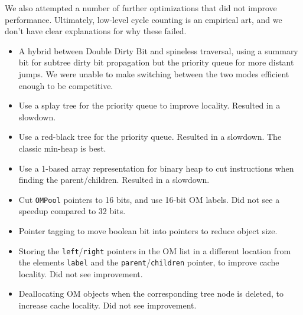 We also attempted a number of further optimizations
  that did not improve performance.
Ultimately, low-level cycle counting is an empirical art,
  and we don't have clear explanations for why these failed.
\begin{itemize}
\item A hybrid between Double Dirty Bit and spineless traversal,
  using a summary bit for subtree dirty bit propagation
  but the priority queue for more distant jumps.
  We were unable to make switching between the two modes efficient enough
  to be competitive.
\item Use a splay tree for the priority queue to improve locality.
  Resulted in a slowdown.
\item Use a red-black tree for the priority queue.
  Resulted in a slowdown. The classic min-heap is best.
\item Use a 1-based array representation for binary heap
  to cut instructions when finding the parent/children.
  Resulted in a slowdown.
\item Cut \texttt{OMPool} pointers to 16 bits, and use 16-bit OM labels.
  Did not see a speedup compared to 32 bits.
\item Pointer tagging to move boolean bit into pointers to reduce object size.
\item Storing the \texttt{left}/\texttt{right} pointers in the OM list in a different location from the elements \texttt{label} and the \texttt{parent}/\texttt{children} pointer, to improve cache locality. Did not see improvement.
\item Deallocating OM objects when the corresponding tree node is deleted, to increase cache locality. Did not see improvement.
\end{itemize}